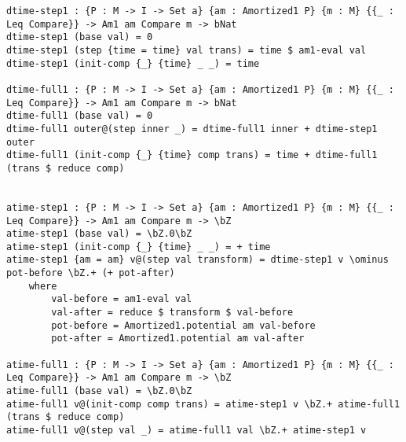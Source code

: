 \begin{lstlisting}[caption={Amortized data structures and functions for data types with two indices},label={lst:appendix:atime1}]
dtime-step1 : {P : M -> I -> Set a} {am : Amortized1 P} {m : M} {{_ : Leq Compare}} -> Am1 am Compare m -> bNat
dtime-step1 (base val) = 0
dtime-step1 (step {time = time} val trans) = time $ am1-eval val
dtime-step1 (init-comp {_} {time} _ _) = time

dtime-full1 : {P : M -> I -> Set a} {am : Amortized1 P} {m : M} {{_ : Leq Compare}} -> Am1 am Compare m -> bNat
dtime-full1 (base val) = 0
dtime-full1 outer@(step inner _) = dtime-full1 inner + dtime-step1 outer
dtime-full1 (init-comp {_} {time} comp trans) = time + dtime-full1 (trans $ reduce comp)


atime-step1 : {P : M -> I -> Set a} {am : Amortized1 P} {m : M} {{_ : Leq Compare}} -> Am1 am Compare m -> \bZ
atime-step1 (base val) = \bZ.0\bZ
atime-step1 (init-comp {_} {time} _ _) = + time
atime-step1 {am = am} v@(step val transform) = dtime-step1 v \ominus pot-before \bZ.+ (+ pot-after)
    where
        val-before = am1-eval val
        val-after = reduce $ transform $ val-before
        pot-before = Amortized1.potential am val-before
        pot-after = Amortized1.potential am val-after

atime-full1 : {P : M -> I -> Set a} {am : Amortized1 P} {m : M} {{_ : Leq Compare}} -> Am1 am Compare m -> \bZ
atime-full1 (base val) = \bZ.0\bZ
atime-full1 v@(init-comp comp trans) = atime-step1 v \bZ.+ atime-full1 (trans $ reduce comp)
atime-full1 v@(step val _) = atime-full1 val \bZ.+ atime-step1 v
\end{lstlisting}